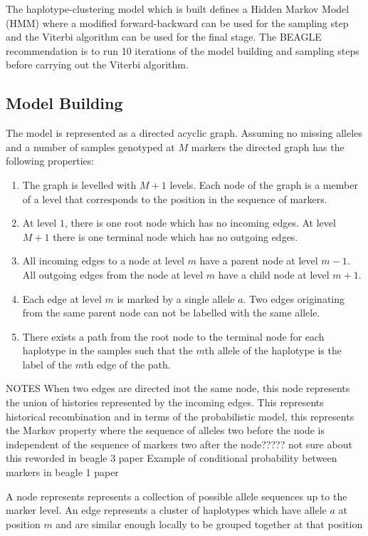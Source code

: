 \documentclass[a4paper,12pt,twoside,abstraction,titlepage]{article}
\begin{document}
The haplotype-clustering model which is built defines a Hidden Markov Model (HMM) where a modified forward-backward can be used for the sampling step and the Viterbi algorithm can be used for the final stage.  The BEAGLE recommendation is to run 10 iterations of the model building and sampling steps before carrying out the Viterbi algorithm.



\subsection{Model Building}
The model is represented as a directed acyclic graph.  Assuming no missing alleles and a number of samples genotyped at $M$ markers the directed graph has the following properties:

\vspace{-5pt}
\begin{enumerate}
\itemsep0pt
\item The graph is levelled with $M+1$ levels. Each node of the graph is a member of a level that corresponds to the position in the sequence of markers.
\item At level $1$, there is one root node which has no incoming edges.  At level $M+1$ there is one terminal node which has no outgoing edges.
\item All incoming edges to a node at level $m$ have a parent node at level $m-1$.  All outgoing edges from the node at level $m$ have a child node at level $m+1$.
\item Each edge at level $m$ is marked by a single allele $a$.  Two edges originating from the same parent node can not be labelled with the same allele.
\item There exists a path from the root node to the terminal node for each haplotype in the samples such that the $m$th allele of the haplotype is the label of the $m$th edge of the path.
\end{enumerate}


NOTES
When two edges are directed inot the same node, this node represents the union of histories represented by the incoming edges. This represents historical recombination and in terms of the probabilistic model, this represents the Markov property where the sequence of alleles two before the node is independent of the sequence of markers two after the node????? not sure about this reworded in beagle 3 paper
Example of conditional probability between markers in beagle 1 paper

A node represents represents a collection of possible allele sequences up to the marker level.
An edge represents a cluster of haplotypes which have allele $a$ at position $m$ and are similar enough locally to be grouped together at that position
\end{document}
